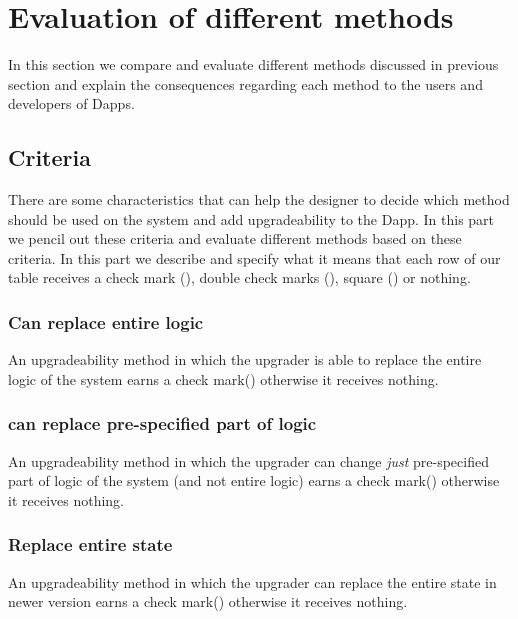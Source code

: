 








 \section{Evaluation of different methods}
 In this section we compare and evaluate different methods discussed in previous section and explain the consequences regarding each method to the users and developers of Dapps.
 \subsection{Criteria}
 There are some characteristics that can help the designer to decide which method should be used on the system and add upgradeability to the Dapp. In this part we pencil out these criteria and evaluate different methods based on these criteria. In this part we describe and specify what it means that each row of our table receives a check mark (\checkmark), double check marks (\checkmark\checkmark), square (\XBox) or nothing. 
 
\subsubsection{Can replace entire logic}
An upgradeability method in which the upgrader is able to replace the entire logic of the system earns a check mark(\checkmark) otherwise it receives nothing.

\subsubsection{can replace pre-specified part of logic}
An upgradeability method in which the upgrader can change \emph{just} pre-specified part of logic of the system (and not entire logic) earns a check mark(\checkmark) otherwise it receives nothing.

\subsubsection{Replace entire state}
An upgradeability method in which the upgrader can replace the entire state in newer version earns a check mark(\checkmark) otherwise it receives nothing.

